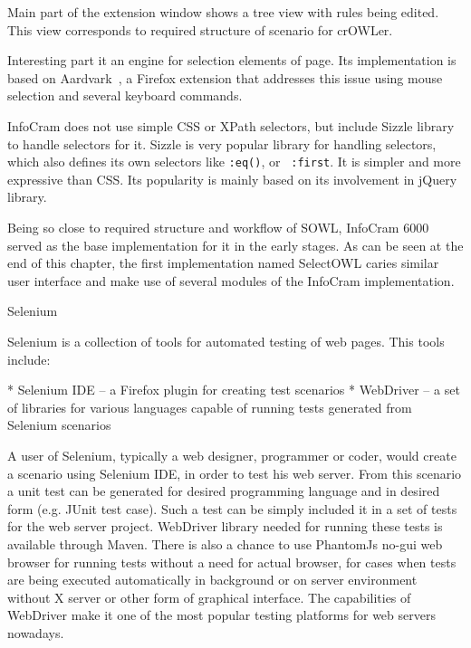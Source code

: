 Main part of the extension window shows a tree view with rules being edited.
This view corresponds to required structure of scenario for crOWLer. 

Interesting part it an engine for selection elements of page. Its
implementation is based on
Aardvark~, a
Firefox extension that addresses this issue using mouse selection and several
keyboard commands. 

InfoCram does not use simple CSS or XPath selectors, but include Sizzle library
to handle selectors for it. Sizzle is very popular library for handling
selectors, which also defines its own selectors like {\tt :eq()}, or {\tt
:first}. It is simpler and more expressive than CSS. Its popularity is 
mainly based on its involvement in jQuery library. 

Being so close to required structure and workflow of SOWL, InfoCram 6000 served
as the base implementation for it in the early stages. As can be seen at the end 
of this chapter, the first implementation named SelectOWL caries similar user
interface and make use of several modules of the InfoCram implementation. 


\secc Selenium

Selenium is a collection of tools for automated testing of web pages. This tools include: 

\begitems
  * Selenium IDE -- a Firefox plugin for creating test scenarios
  * WebDriver -- a set of libraries for various languages capable of running
    tests generated from Selenium scenarios
\enditems

A user of Selenium, typically a web designer, programmer or coder, would create
a scenario using Selenium IDE, in order to test his web server. From this
scenario a unit test can be generated for desired programming language and in
desired form (e.g. JUnit test case). Such a test can be simply included it in a
set of tests for the web server project. WebDriver library needed for running
these tests is available through Maven. There is also a chance to use PhantomJs
no-gui web browser for running tests without a need for actual browser, for
cases when tests are being executed automatically in background or on server
environment without X server or other form of graphical interface. The
capabilities of WebDriver make it one of the most popular testing platforms for
web servers nowadays. 

%

